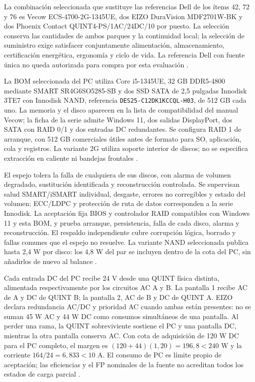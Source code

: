 La combinación seleccionada que sustituye las referencias Dell de los ítems 42, 72 y 76 es Vecow ECS-4700-2G-1345UE, dos EIZO DuraVision MDF2701W-BK y dos Phoenix Contact QUINT4-PS/1AC/24DC/10 por puesto. La selección conserva las cantidades de ambos parques y la continuidad local; la selección de suministro exige satisfacer conjuntamente alimentación, almacenamiento, certificación energética, ergonomía y ciclo de vida. La referencia Dell con fuente única no queda autorizada para compra por esta evaluación \parencite[RT-08.02/04/08/13, pp.~18--19]{pucv-transversal}.

La BOM seleccionada del PC utiliza Core i5-1345UE, 32 GB DDR5-4800 mediante SMART SR4G6SO5285-SB y dos SSD SATA de 2,5 pulgadas Innodisk 3TE7 con Innodisk NAND, referencia \texttt{DES25-C12DK1KCCQL-H03}, de 512 GB cada uno. La memoria y el disco aparecen en la lista de compatibilidad del manual Vecow; la ficha de la serie admite Windows 11, dos salidas DisplayPort, dos SATA con RAID 0/1 y dos entradas DC redundantes. Se configura RAID 1 de arranque, con 512 GB comerciales útiles antes de formato para SO, aplicación, cola y registros. La variante 2G utiliza soporte interior de discos; no se especifica extracción en caliente ni bandejas frontales \parencites[pp.~7--8, 93--98 y 104--105]{p6-puestos-vecow-manual}{p9-vecow-datasheet-2025}.

El espejo tolera la falla de cualquiera de sus discos, con alarma de volumen degradado, sustitución identificada y reconstrucción controlada. Se supervisan salud SMART/iSMART individual, desgaste, errores no corregibles y estado del volumen; ECC/LDPC y protección de ruta de datos corresponden a la serie Innodisk. La aceptación fija BIOS y controlador RAID compatibles con Windows 11 y esta BOM, y prueba arranque, persistencia, falla de cada disco, alarma y reconstrucción. El respaldo independiente cubre corrupción lógica, borrado y fallas comunes que el espejo no resuelve. La variante NAND seleccionada publica hasta 2,4 W por disco: los 4,8 W del par se incluyen dentro de la cota del PC, sin añadirlos de nuevo al balance \parencites{p9-innodisk-3te7-nand,p9-innodisk-3te7-producto}.

Cada entrada DC del PC recibe 24 V desde una QUINT física distinta, alimentada respectivamente por los circuitos AC A y B. La pantalla 1 recibe AC de A y DC de QUINT B; la pantalla 2, AC de B y DC de QUINT A. EIZO declara redundancia AC/DC y prioridad AC cuando ambas están presentes: no se suman 45 W AC y 44 W DC como consumos simultáneos de una pantalla. Al perder una rama, la QUINT sobreviviente sostiene el PC y una pantalla DC, mientras la otra pantalla conserva AC. Con cota de adquisición de 120 W DC para el PC completo, el margen es $(120+44)(1,20)=196,8<240$ W y la corriente $164/24=6,833<10$ A. El consumo de PC es límite propio de aceptación; las eficiencias y el FP nominales de la fuente no acreditan todos los estados de carga parcial \parencites{p6-puestos-quint,p6-puestos-eizo}[p.~15]{p6-puestos-eizo-setup}.


